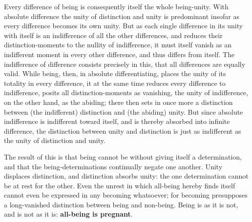 \documentclass[12pt,a4paper,openany]{book}
\newcommand{\opage}[1]{\marginnote{\footnotesize\textit{[#1]}}}
\begin{document}
Every difference of being is consequently itself the whole being-unity. With absolute difference the unity of distinction and unity is predominant insofar as every difference becomes its own unity. But as each single difference in its unity with itself is an indifference of all the other differences, and reduces their distinction-moments to the nullity of indifference, it must itself vanish as an indifferent moment in every other difference, and thus differs from itself. The indifference of difference consists precisely in this, that all differences are equally valid. While being, then, in absolute differentiating, places the unity of its totality in every difference, it at the same time reduces every difference to indifference, posits all distinction-moments as vanishing, the unity of indifference, on the other hand, as the abiding; there then sets in once more a distinction between (the indifferent) distinction and (the abiding) unity. But since absolute indifference is indifferent toward itself, and is thereby absorbed into infinite difference, the distinction between unity and distinction is just as indifferent as the unity of distinction and unity.

The result of this is that being cannot be without giving itself a determination, and that the being-determinations continually negate one another. Unity displaces distinction, and distinction absorbs unity: the one determination cannot be at rest for the other. Even the unrest in which all-being hereby finds itself cannot even be expressed in any becoming whatsoever; for becoming
\setcounter{footnote}{0}%
\opage{80}presupposes a long-vanished distinction between being and non-being. Being is as it is not, and is not as it is: \textbf{all-being is pregnant}.
\end{document}
